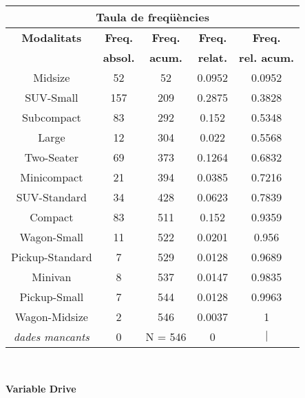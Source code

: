 \begin{center}
\begin{tabular}{|c|c|c|c|@{}c@{}|}
\hline
\multicolumn{5}{|c|}{\bf Taula de freq\" u\`encies} \\ 
\hline
{\bf Modalitats} & {\bf Freq.} & {\bf Freq.} & {\bf Freq.} & {\bf Freq.} \\ 
 & {\bf absol.} & {\bf acum.} & {\bf relat.} & {\bf rel. acum.} \\ 
\hline
\hline
Midsize & 52 & 52 & 0.0952 & 0.0952 \\ 
SUV-Small & 157 & 209 & 0.2875 & 0.3828 \\ 
Subcompact & 83 & 292 & 0.152 & 0.5348 \\ 
Large & 12 & 304 & 0.022 & 0.5568 \\ 
Two-Seater & 69 & 373 & 0.1264 & 0.6832 \\ 
Minicompact & 21 & 394 & 0.0385 & 0.7216 \\ 
SUV-Standard & 34 & 428 & 0.0623 & 0.7839 \\ 
Compact & 83 & 511 & 0.152 & 0.9359 \\ 
Wagon-Small & 11 & 522 & 0.0201 & 0.956 \\ 
Pickup-Standard & 7 & 529 & 0.0128 & 0.9689 \\ 
Minivan & 8 & 537 & 0.0147 & 0.9835 \\ 
Pickup-Small & 7 & 544 & 0.0128 & 0.9963 \\ 
Wagon-Midsize & 2 & 546 & 0.0037 & 1 \\ 
\hline
\hline
\it dades mancants & 0 & N = 546 & 0 & \colorbox{gris}{\color{gris}$|$ \hspace{11ex}} \\ 
\hline
\end{tabular}
\end{center} \vfill

\vspace{3ex}
\mbox{ } \vfill
\begin{center} \Large \bf Variable Drive \end{center}

